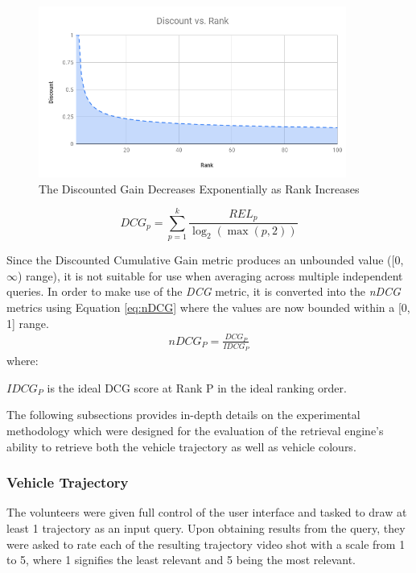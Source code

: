 \begin{figure}[!ht]
\centering
\includegraphics[width=0.9\textwidth]{image/retrievalTwo/discountvsrank.png}
\caption{The Discounted Gain Decreases Exponentially as Rank Increases}
\label{fig:dcgGain}       %
\end{figure}

\begin{equation}
\label{eq:DCGk}
DCG_p = \sum_{p=1}^k\frac{REL_{p}}{\log_2 (\max (p,2))}
\end{equation}


Since the Discounted Cumulative Gain metric produces an unbounded value ([0, $\infty$) range), it is not suitable for use when averaging across multiple independent queries. In order to make use of the \textit{DCG} metric, it is converted into the \textit{nDCG} metrics using Equation \ref{eq:nDCG} where the values are now bounded within a [0, 1] range.
\begin{align}
\label{eq:nDCG}
\textit{nDCG}_P = \frac{DCG_P}{IDCG_P}
\end{align}
where:

\hspace{2em} $IDCG_P$ is the ideal DCG score at Rank P in the ideal ranking order.

The following subsections provides in-depth details on the experimental methodology which were designed for the evaluation of the retrieval engine's ability to retrieve both the vehicle trajectory as well as vehicle colours.


\subsubsection{Vehicle Trajectory}
The volunteers were given full control of the user interface and tasked to draw
at least 1 trajectory as an input query. Upon obtaining results from the query,
they were asked to rate each of the resulting trajectory video shot with a scale from 1 to 5, where 1 signifies the least relevant and 5 being the most relevant.

